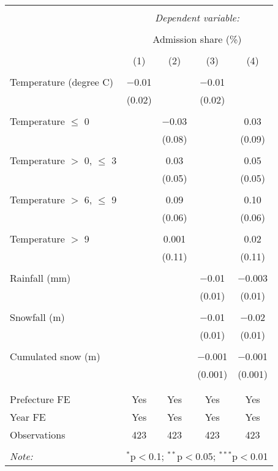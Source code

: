 
\begin{tabular}{@{\extracolsep{5pt}}lcccc} 
\\[-1.8ex]\hline 
\hline \\[-1.8ex] 
 & \multicolumn{4}{c}{\textit{Dependent variable:}} \\ 
\cline{2-5} 
\\[-1.8ex] & \multicolumn{4}{c}{Admission share (\%)} \\ 
\\[-1.8ex] & (1) & (2) & (3) & (4)\\ 
\hline \\[-1.8ex] 
 Temperature (degree C) & $-$0.01 &  & $-$0.01 &  \\ 
  & (0.02) &  & (0.02) &  \\ 
  & & & & \\ 
 Temperature $\le$ 0 &  & $-$0.03 &  & 0.03 \\ 
  &  & (0.08) &  & (0.09) \\ 
  & & & & \\ 
 Temperature $>$ 0, $\le$ 3 &  & 0.03 &  & 0.05 \\ 
  &  & (0.05) &  & (0.05) \\ 
  & & & & \\ 
 Temperature $>$ 6, $\le$ 9 &  & 0.09 &  & 0.10 \\ 
  &  & (0.06) &  & (0.06) \\ 
  & & & & \\ 
 Temperature $>$ 9 &  & 0.001 &  & 0.02 \\ 
  &  & (0.11) &  & (0.11) \\ 
  & & & & \\ 
 Rainfall (mm) &  &  & $-$0.01 & $-$0.003 \\ 
  &  &  & (0.01) & (0.01) \\ 
  & & & & \\ 
 Snowfall (m) &  &  & $-$0.01 & $-$0.02 \\ 
  &  &  & (0.01) & (0.01) \\ 
  & & & & \\ 
 Cumulated snow (m) &  &  & $-$0.001 & $-$0.001 \\ 
  &  &  & (0.001) & (0.001) \\ 
  & & & & \\ 
\hline \\[-1.8ex] 
Prefecture FE & Yes & Yes & Yes & Yes \\ 
Year FE & Yes & Yes & Yes & Yes \\ 
Observations & 423 & 423 & 423 & 423 \\ 
\hline 
\hline \\[-1.8ex] 
\textit{Note:}  & \multicolumn{4}{r}{$^{*}$p$<$0.1; $^{**}$p$<$0.05; $^{***}$p$<$0.01} \\ 
\end{tabular} 
